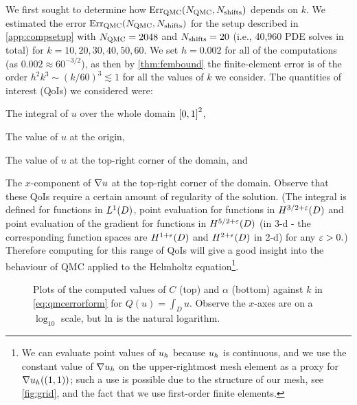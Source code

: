 We first sought to determine how $\QMCerror{\NQMC}{\Nshifts}$ depends on $k.$ We estimated the error $\QMCerror{\NQMC}{\Nshifts}$ for the setup described in \cref{app:compsetup} with $N_{\mathrm{QMC}} = 2048$ and $N_{\mathrm{shifts}}=20$ (i.e., 40,960 PDE solves in total) for $k = 10,20,30,40,50,60$. We set $h = 0.002$ for all of the computations (as $0.002 \approx 60^{-3/2}$), as then by \cref{thm:fembound} the finite-element error is of the order $h^2k^3 \sim (k/60)^3 \lesssim 1$ for all the values of $k$ we consider. The quantities of interest (QoIs) we considered were:
\bit
\item The integral of $u$ over the whole domain $\mleft[0,1\mright]^2$,
\item The value of $u$ at the origin,
\item The value of $u$ at the top-right corner of the domain, and
\item The $x$-component of $\nabla u$ at the top-right corner of the domain.
  \eit
  Observe that these QoIs require a certain amount of regularity of the solution. (The integral is defined for functions in $\LoD$, point evaluation for functions in $\Hfn{}{3/2 + \eps}{D}$ and point evaluation of the gradient for functions in $\Hfn{}{5/2+\eps}{D}$ (in 3-d - the corresponding function spaces are $\Hfn{}{1+\eps}{D}$ and $\Hfn{}{2+\eps}{D}$ in 2-d) for any $\varepsilon > 0.$) Therefore computing for this range of QoIs will give a good insight into the behaviour of QMC applied to the Helmholtz equation\footnote{We can evaluate point values of $u_{h}$ because $u_{h}$ is continuous, and we use the constant value of $\nabla u_{h}$ on the upper-rightmost mesh element as a proxy for $\nabla u_{h}((1,1))$; such a use is possible due to the structure of our mesh, see \cref{fig:grid}, and the fact that we use first-order finite elements.}.


\begin{figure}[h]
    \centering
    \begin{subfigure}{\textwidth}
      \centering

    \end{subfigure}
    \begin{subfigure}{\textwidth}
                \centering
      
    \end{subfigure}
\caption[The computed Quasi-Monte-Carlo convergence rate for $Q(u) =  \int_D u$.]{Plots of the computed values of $C$ (top) and $\alpha$ (bottom) against $k$ in \cref{eq:qmcerrorform} for $Q(u) = \int_D u$. Observe the $x$-axes are on a $\log_{10}$ scale, but $\operatorname{ln}$ is the natural logarithm. \label{fig:integralCalpha}}
\end{figure}

